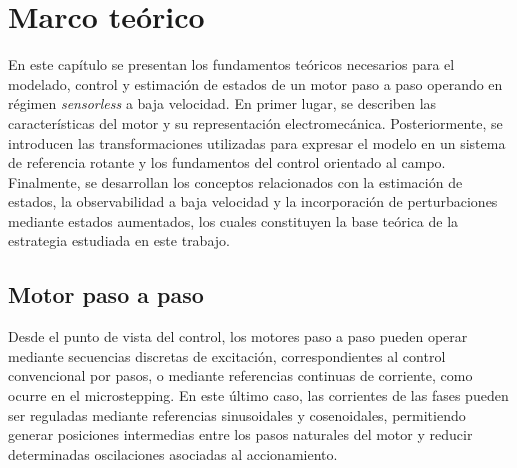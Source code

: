 
\chapter{Marco teórico}

En este capítulo se presentan los fundamentos teóricos necesarios para el 
modelado, control y estimación de estados de un motor paso a paso operando 
en régimen \textit{sensorless} a baja velocidad. En primer lugar, se describen 
las características del motor y su representación electromecánica. 
Posteriormente, se introducen las transformaciones utilizadas para expresar 
el modelo en un sistema de referencia rotante y los fundamentos del control 
orientado al campo. Finalmente, se desarrollan los conceptos relacionados 
con la estimación de estados, la observabilidad a baja velocidad y la 
incorporación de perturbaciones mediante estados aumentados, los cuales 
constituyen la base teórica de la estrategia estudiada en este trabajo.



\section{Motor paso a paso}

%
%
%

Desde el punto de vista del control, los motores paso a paso pueden operar 
mediante secuencias discretas de excitación, correspondientes al control 
convencional por pasos, o mediante referencias continuas de corriente, como 
ocurre en el microstepping. En este último caso, las corrientes de las fases 
pueden ser reguladas mediante referencias sinusoidales y cosenoidales, 
permitiendo generar posiciones intermedias entre los pasos naturales del motor 
y reducir determinadas oscilaciones asociadas al accionamiento.

